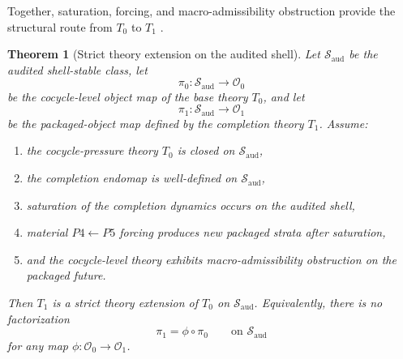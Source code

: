 \documentclass[11pt]{article}
\newtheorem{theorem}{Theorem}[section]
\theoremstyle{definition}
\newcommand{\Tzero}{T_0}
\newcommand{\Tone}{T_1}
\begin{document}
Together, saturation, forcing, and macro-admissibility obstruction provide the structural route from \(\Tzero\) to \(\Tone\) \cite{TsiokosFoundations}.

\begin{theorem}[Strict theory extension on the audited shell]\label{thm:strict-extension}
Let \(\mathcal{S}_{\mathrm{aud}}\) be the audited shell-stable class, let
\[
\pi_0:\mathcal{S}_{\mathrm{aud}}\to \mathcal{O}_0
\]
be the cocycle-level object map of the base theory \(\Tzero\), and let
\[
\pi_1:\mathcal{S}_{\mathrm{aud}}\to \mathcal{O}_1
\]
be the packaged-object map defined by the completion theory \(\Tone\). Assume:
\begin{enumerate}
    \item the cocycle-pressure theory \(\Tzero\) is closed on \(\mathcal{S}_{\mathrm{aud}}\),
    \item the completion endomap is well-defined on \(\mathcal{S}_{\mathrm{aud}}\),
    \item saturation of the completion dynamics occurs on the audited shell,
    \item material \(P4\leftarrow P5\) forcing produces new packaged strata after saturation,
    \item and the cocycle-level theory exhibits macro-admissibility obstruction on the packaged future.
\end{enumerate}
Then \(\Tone\) is a strict theory extension of \(\Tzero\) on \(\mathcal{S}_{\mathrm{aud}}\). Equivalently, there is no factorization
\[
\pi_1=\phi\circ \pi_0
\qquad \text{on } \mathcal{S}_{\mathrm{aud}}
\]
for any map \(\phi:\mathcal{O}_0\to\mathcal{O}_1\).
\end{theorem}
\end{document}
